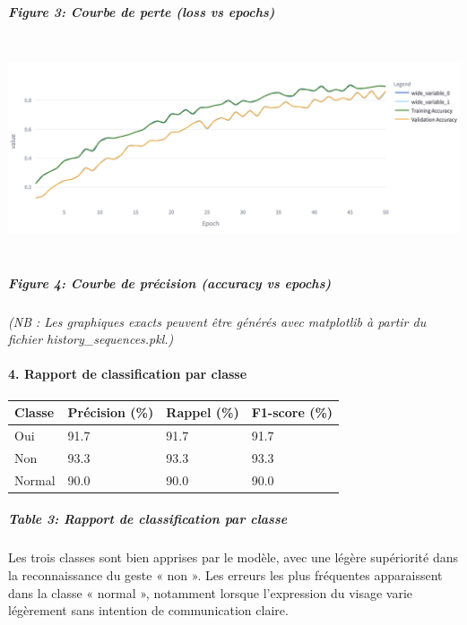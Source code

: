 \documentclass[
]{article}
\begin{document}
\hypertarget{figure-3-courbe-de-perte-loss-vs-epochs}{%
\subparagraph{Figure 3: Courbe de perte (loss vs epochs)}\label{figure-3-courbe-de-perte-loss-vs-epochs}}

\includegraphics[width=6.5in,height=2.45833in]{0528136f-968b-4a39-becd-3323677c0324_media/media/image2.png}

\hypertarget{figure-4-courbe-de-pruxe9cision-accuracy-vs-epochs}{%
\subparagraph{Figure 4: Courbe de précision (accuracy vs epochs)}\label{figure-4-courbe-de-pruxe9cision-accuracy-vs-epochs}}

\emph{(NB : Les graphiques exacts peuvent être générés avec matplotlib à partir du fichier history\_sequences.pkl.)}

\hypertarget{rapport-de-classification-par-classe}{%
\paragraph{\texorpdfstring{\textbf{4. Rapport de classification par classe}}{4. Rapport de classification par classe}}\label{rapport-de-classification-par-classe}}

\begin{longtable}[]{@{}llll@{}}
\toprule
\textbf{Classe} & \textbf{Précision (\%)} & \textbf{Rappel (\%)} & \textbf{F1-score (\%)} \\
\midrule
\endhead
Oui & 91.7 & 91.7 & 91.7 \\
Non & 93.3 & 93.3 & 93.3 \\
Normal & 90.0 & 90.0 & 90.0 \\
\bottomrule
\end{longtable}

\hypertarget{table-3-rapport-de-classification-par-classe}{%
\subparagraph{Table 3: Rapport de classification par classe}\label{table-3-rapport-de-classification-par-classe}}

Les trois classes sont bien apprises par le modèle, avec une légère supériorité dans la reconnaissance du geste « non ». Les erreurs les plus fréquentes apparaissent dans la classe « normal », notamment lorsque l'expression du visage varie légèrement sans intention de communication claire.
\end{document}
